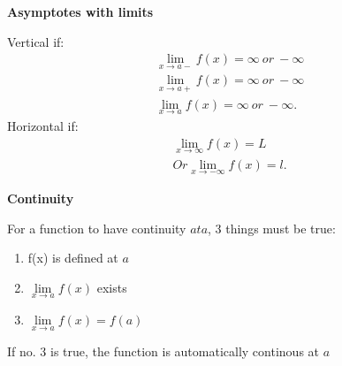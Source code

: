 \documentclass{report}
\begin{document}
    \bigbreak \noindent \bigbreak \noindent 
    \begin{large}
        \textbf{Asymptotes with limits}
    \end{large}
    \bigbreak \noindent 
    Vertical if:
    \begin{align*}
        \lim\limits_{x \to a-}{f(x) = \infty\ or\ -\infty} \\
        \lim\limits_{x \to a+}{f(x) = \infty\ or\ -\infty} \\
        \lim\limits_{x \to a}{f(x) = \infty\ or\ -\infty}
    .\end{align*}
    \bigbreak \noindent \bigbreak \noindent
    Horizontal if:
    \begin{align*}
        \lim\limits_{x \to \infty }{f(x) = L}          \\
        Or \lim\limits_{x \to -\infty}{f(x) = l}
    .\end{align*}

      \pagebreak \bigbreak \noindent
      \begin{large}
          \textbf{Continuity}
      \end{large}
      \bigbreak \noindent 
    For a function to have continuity $at a$, 3 things must be true:
      \begin{enumerate}
        \item f(x) is defined at $a$
        \item $\lim\limits_{x \to a}{f(x)}$ exists
        \item $\lim\limits_{x \to a}{f(x) = f(a)} $
      \end{enumerate}
      If no. 3 is true, the function is automatically continous at $a$
\end{document}
